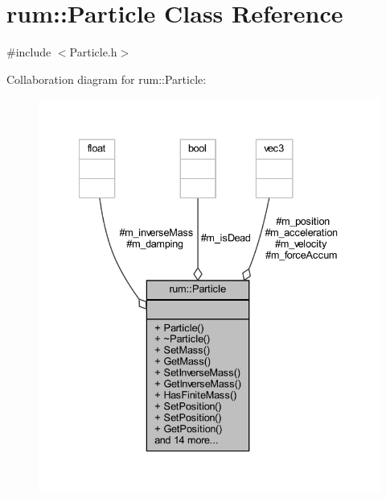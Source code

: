 \hypertarget{classrum_1_1_particle}{}\section{rum\+:\+:Particle Class Reference}
\label{classrum_1_1_particle}


{\ttfamily \#include $<$Particle.\+h$>$}



Collaboration diagram for rum\+:\+:Particle\+:\nopagebreak
\begin{figure}[H]
\begin{center}
\leavevmode
\includegraphics[width=335pt]{classrum_1_1_particle__coll__graph}
\end{center}
\end{figure}

